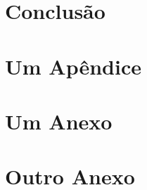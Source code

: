 \documentclass[tcc,capa]{texufpel}
\begin{document}
\chapter{Conclusão}


 

\apendices
\chapter{Um Apêndice}

\anexos
\chapter{Um Anexo}


\chapter{Outro Anexo}
\end{document}
